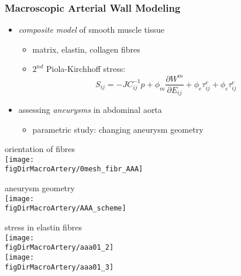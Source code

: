 \begin{frame}
  \frametitle{Macroscopic Arterial Wall Modeling}
  \begin{itemize}
  \item \emph{composite model} of smooth muscle tissue
    \begin{itemize}
    \item matrix, elastin, collagen fibres
    \item $2^{nd}$ Piola-Kirchhoff stress:
      \begin{equation}
        \label{eq:2pk}
        S_{ij} = - J C_{ij}^{-1}p + \phi_m \frac{\partial W^m}{\partial E_{ij}}
        + \phi_e \tau_{ij}^e + \phi_c \tau_{ij}^c
      \end{equation}
    \end{itemize}
  \item assessing \emph{aneurysms} in abdominal aorta
    \begin{itemize}
    \item parametric study: changing aneurysm geometry
    \end{itemize}
  \end{itemize}
  \begin{center}
    \begin{minipage}{0.28\linewidth}
      \scriptsize
      orientation of fibres \\
      \texttt{[image: \\figDirMacroArtery/0mesh\_fibr\_AAA]}
    \end{minipage}
    \hfill
    \begin{minipage}{0.4\linewidth}
      \scriptsize
      aneurysm geometry \\
      \texttt{[image: \\figDirMacroArtery/AAA\_scheme]}
    \end{minipage}
    \hfill
    \begin{minipage}{0.28\linewidth}
      \scriptsize
      stress in elastin fibres \\
      \texttt{[image: \\figDirMacroArtery/aaa01\_2]} \\
      \texttt{[image: \\figDirMacroArtery/aaa01\_3]}
    \end{minipage}
  \end{center}
\end{frame}
